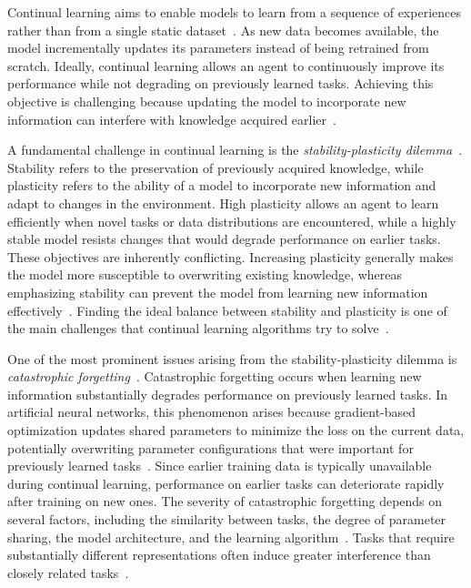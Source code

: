 Continual learning aims to enable models to learn from a sequence of experiences rather than from a single static dataset~\cite{khetarpal2022crl,wang2024cl}.
As new data becomes available, the model incrementally updates its parameters instead of being retrained from scratch.
Ideally, continual learning allows an agent to continuously improve its performance while not degrading on previously learned tasks.
Achieving this objective is challenging because updating the model to incorporate new information can interfere with knowledge acquired earlier~\cite{wang2024cl,mccloskey1989catastforget}.

A fundamental challenge in continual learning is the \textit{stability-plasticity dilemma}~\cite{wang2024cl}.
Stability refers to the preservation of previously acquired knowledge, while plasticity refers to the ability of a model to incorporate new information and adapt to changes in the environment.
High plasticity allows an agent to learn efficiently when novel tasks or data distributions are encountered, while a highly stable model resists changes that would degrade performance on earlier tasks.
These objectives are inherently conflicting.
Increasing plasticity generally makes the model more susceptible to overwriting existing knowledge, whereas emphasizing stability can prevent the model from learning new information effectively~\cite{wang2024cl,dohare2024plasticity}.
Finding the ideal balance between stability and plasticity is one of the main challenges that continual learning algorithms try to solve~\cite{wang2024cl}.

One of the most prominent issues arising from the stability-plasticity dilemma is \textit{catastrophic forgetting}~\cite{wang2024cl,mccloskey1989catastforget}.
Catastrophic forgetting occurs when learning new information substantially degrades performance on previously learned tasks.
In artificial neural networks, this phenomenon arises because gradient-based optimization updates shared parameters to minimize the loss on the current data, potentially overwriting parameter configurations that were important for previously learned tasks~\cite{mccloskey1989catastforget}.
Since earlier training data is typically unavailable during continual learning, performance on earlier tasks can deteriorate rapidly after training on new ones.
The severity of catastrophic forgetting depends on several factors, including the similarity between tasks, the degree of parameter sharing, the model architecture, and the learning algorithm~\cite{khetarpal2022crl,wang2024cl}.
Tasks that require substantially different representations often induce greater interference than closely related tasks~\cite{wang2024cl}.

